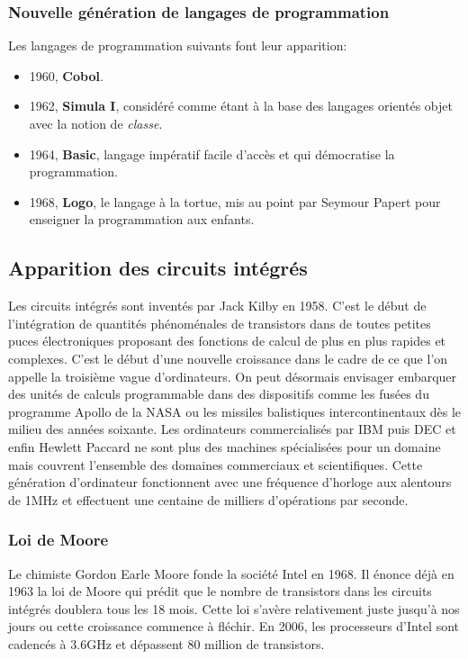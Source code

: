 \documentclass[a4paper,11pt]{book}
\begin{document}
\subsubsection{Nouvelle génération de langages de programmation}
Les langages de programmation suivants font leur apparition:
\begin{itemize}
    \item 1960, \textbf{Cobol}.
    \item 1962, \textbf{Simula I}, considéré comme étant à la base des langages orientés objet avec la notion de \textit{classe}.
    \item 1964, \textbf{Basic}, langage impératif facile d'accès et qui démocratise la programmation.
    \item 1968, \textbf{Logo}, le langage à la tortue, mis au point par Seymour Papert pour enseigner la programmation aux enfants.
\end{itemize}
 
\subsection{Apparition des circuits intégrés}
Les circuits intégrés sont inventés par Jack Kilby en 1958. C'est le début de l'intégration de quantités phénoménales de transistors dans de toutes petites puces électroniques proposant des fonctions de calcul de plus en plus rapides et complexes. C'est le début d'une nouvelle croissance dans le cadre de ce que l'on appelle la troisième vague d'ordinateurs. On peut désormais envisager embarquer des unités de calculs programmable dans des dispositifs comme les fusées du programme Apollo de la NASA ou les missiles balistiques intercontinentaux dès le milieu des années soixante.
Les ordinateurs commercialisés par IBM puis DEC et enfin Hewlett Paccard ne sont plus des machines spécialisées pour un domaine mais couvrent l'ensemble des domaines commerciaux et scientifiques.
Cette génération d'ordinateur fonctionnent avec une fréquence d'horloge aux alentours de 1MHz et effectuent une centaine de milliers d'opérations par seconde.

\subsubsection{Loi de Moore}
Le chimiste Gordon Earle Moore fonde la société Intel en 1968. Il énonce déjà en 1963 la loi de Moore qui prédit que le nombre de transistors dans les circuits intégrés doublera tous les 18 mois. Cette loi s'avère relativement juste jusqu'à nos jours ou cette croissance commence à fléchir. En 2006, les processeurs d'Intel sont cadencés à 3.6GHz et dépassent 80 million de transistors.
\end{document}
